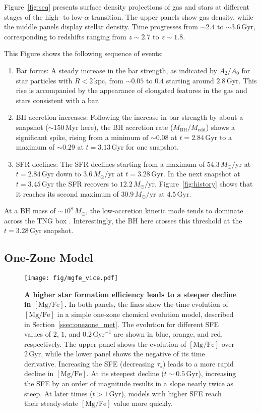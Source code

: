 \documentclass[twocolumn]{aastex631}
\newcommand{\Msun}{\ensuremath{M_{\odot}}}
\newcommand{\Gyr}{\ensuremath{\textrm{Gyr}}}
\newcommand{\Myr}{\ensuremath{\textrm{Myr}}}
\newcommand{\kpc}{\ensuremath{\textrm{kpc}}}
\newcommand{\MgFe}{\ensuremath{[\textrm{Mg}/\textrm{Fe}]}}
\newcommand{\Msunyr}{\ensuremath{\Msun/\textrm{yr}}}
\begin{document}
Figure~\ref{fig:seq} presents surface density projections of gas and stars at different stages of the high- to low-$\alpha$ transition. The upper panels show gas density, while the middle panels display stellar density. Time progresses from $\sim2.4$ to $\sim3.6\,\textrm{Gyr}$, corresponding to redshifts ranging from $z\sim2.7$ to $z\sim1.8$.

This Figure shows the following sequence of events:
\begin{enumerate}
    \item Bar forms: A steady increase in the bar strength, as indicated by $A_2/A_0$ for star particles with $R<2\,\kpc$, from $\sim0.05$ to $0.4$ starting around $2.8\,\textrm{Gyr}$. This rise is accompanied by the appearance of elongated features in the gas and stars consistent with a bar.
    \item BH accretion increases: Following the increase in bar strength by about a snapshot ($\sim150\,\Myr$ here), the BH accretion rate ($\dot{M}_{\textrm{BH}}/\dot{M}_{\textrm{edd}}$) shows a significant spike, rising from a minimum of $\sim0.08$ at $t=2.84\,\Gyr$ to a maximum of $\sim0.29$ at $t=3.13\,\Gyr$ for one snapshot.
    \item SFR declines: The SFR declines starting from a maximum of $54.3\,\Msunyr$ at $t=2.84\,\Gyr$ down to $3.6\,\Msunyr$ at $t=3.28\,\Gyr$. In the next snapshot at $t=3.45\,\Gyr$ the SFR recovers to $12.2\,\Msunyr$. Figure~\ref{fig:history} shows that it reaches its second maximum of $30.9\,\Msunyr$ at $4.5\,\Gyr$.
\end{enumerate}

At a BH mass of $\sim10^8\,\Msun$, the low-accretion kinetic mode tends to dominate across the TNG box \citep{2017MNRAS.465.3291W}. Interestingly, the BH here crosses this threshold at the $t=3.28\,\Gyr$ snapshot.

\subsection{One-Zone Model}\label{ssec:onezone}

\begin{figure}
  \centering
  \texttt{[image: fig/mgfe\_vice.pdf]}
  \caption{\textbf{A higher star formation efficiency leads to a steeper decline in \MgFe{}.} In both panels, the lines show the time evolution of \MgFe{} in a simple one-zone chemical evolution model, described in Section~\ref{ssec:onezone_met}. The evolution for different SFE values of $2$, $1$, and $0.2\,\textrm{Gyr}^{-1}$ are shown in blue, orange, and red, respectively.  The upper panel shows the evolution of \MgFe{} over $2\,\Gyr$, while the lower panel shows the negative of its time derivative. Increasing the SFE (decreasing $\tau_\star$) leads to a more rapid decline in \MgFe{}. At its steepest decline ($t\sim0.5\,\Gyr$), increasing the SFE by an order of magnitude results in a slope nearly twice as steep. At later times ($t > 1\,\Gyr$), models with higher SFE reach their steady-state \MgFe{} value more quickly.}
  \label{fig:vice}
\end{figure}
\end{document}
